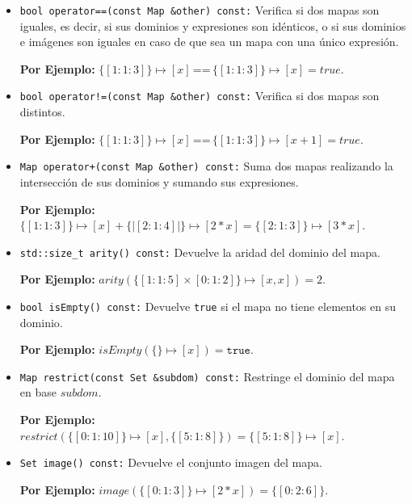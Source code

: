 \begin{itemize}
    \item \texttt{bool operator==(const Map \&other) const:} Verifica si dos mapas son iguales, es decir, si sus dominios y expresiones son idénticos, o si sus dominios e imágenes son iguales en caso de que sea un mapa con una único expresión.
    \begin{center}
        \textbf{Por Ejemplo:} $\{[1:1:3]\} \mapsto [x] \,\texttt{==}\, \{[1:1:3]\} \mapsto [x] =  \textit{true}$.
    \end{center}

    \item \texttt{bool operator!=(const Map \&other) const:} Verifica si dos mapas son distintos.
    \begin{center}
        \textbf{Por Ejemplo:} $\{[1:1:3]\} \mapsto [x] \,\texttt{==}\, \{[1:1:3]\} \mapsto [x+1] =  \textit{true}$.
    \end{center}

    \item \texttt{Map operator+(const Map \&other) const:} Suma dos mapas realizando la intersección de sus dominios y sumando sus expresiones.
    \begin{center}
        \textbf{Por Ejemplo:} $\{[1:1:3]\} \mapsto  [x] + \{|[2:1:4]|\} \mapsto [2*x] = \{[2:1:3]\} \mapsto [3*x]$.
    \end{center}


    \item \texttt{std::size\_t arity() const:} Devuelve la aridad del dominio del mapa.
    \begin{center}
        \textbf{Por Ejemplo:} $arity(\{[1:1:5] \times [0:1:2]\} \mapsto [x,x]) = 2$.
    \end{center}

    \item \texttt{bool isEmpty() const:} Devuelve \texttt{true} si el mapa no tiene elementos en su dominio.
    \begin{center}
        \textbf{Por Ejemplo:} $isEmpty(\{\} \mapsto [x]) = \texttt{true}$.
    \end{center}

    \item \texttt{Map restrict(const Set \&subdom) const:} Restringe el dominio del mapa en base $subdom$.
    \begin{center}
        \textbf{Por Ejemplo:} $restrict(\{[0:1:10]\} \mapsto [x],\{[5:1:8]\}) = \{[5:1:8]\} \mapsto [x]$.
    \end{center}

    \item \texttt{Set image() const:} Devuelve el conjunto imagen del mapa.
    \begin{center}
        \textbf{Por Ejemplo:} $image(\{[0:1:3]\} \mapsto [2*x]) = \{[0:2:6]\}$.
    \end{center}


\end{itemize}
